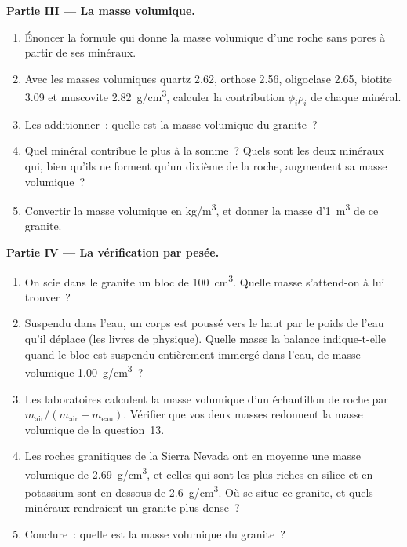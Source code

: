 \begin{problem}
\medskip
\noindent\textbf{Partie III --- La masse volumique.}
\begin{enumerate}[resume]
  \item Énoncer la formule qui donne la masse volumique d'une roche sans
        pores à partir de ses minéraux.
  \item Avec les masses volumiques quartz \qty{2.62}{}, orthose
        \qty{2.56}{}, oligoclase \qty{2.65}{}, biotite \qty{3.09}{} et
        muscovite \qty{2.82}{g/cm^3}, calculer la contribution
        $\phi_i \rho_i$ de chaque minéral.
  \item Les additionner~: quelle est la masse volumique du granite~?
  \item Quel minéral contribue le plus à la somme~? Quels sont les deux
        minéraux qui, bien qu'ils ne forment qu'un dixième de la roche,
        augmentent sa masse volumique~?
  \item Convertir la masse volumique en \unit{kg/m^3}, et donner la masse
        d'\qty{1}{m^3} de ce granite.
\end{enumerate}

\medskip
\noindent\textbf{Partie IV --- La vérification par pesée.}
\begin{enumerate}[resume]
  \item On scie dans le granite un bloc de \qty{100}{cm^3}. Quelle masse
        s'attend-on à lui trouver~?
  \item Suspendu dans l'eau, un corps est poussé vers le haut par le poids
        de l'eau qu'il déplace (les livres de physique). Quelle masse la
        balance indique-t-elle quand le bloc est suspendu entièrement
        immergé dans l'eau, de masse volumique \qty{1.00}{g/cm^3}~?
  \item Les laboratoires calculent la masse volumique d'un échantillon de
        roche par
        $m_{\text{air}}/(m_{\text{air}} - m_{\text{eau}})$. Vérifier que
        vos deux masses redonnent la masse volumique de la question~13.
  \item Les roches granitiques de la Sierra Nevada ont en moyenne une masse
        volumique de \qty{2.69}{g/cm^3}, et celles qui sont les plus riches
        en silice et en potassium sont en dessous de \qty{2.6}{g/cm^3}. Où
        se situe ce granite, et quels minéraux rendraient un granite plus
        dense~?
  \item Conclure~: quelle est la masse volumique du granite~?
\end{enumerate}
\end{problem}
